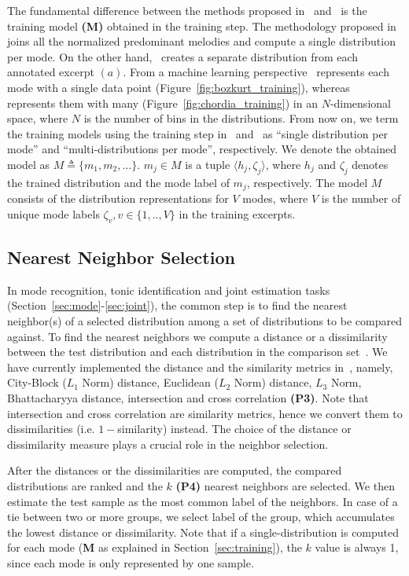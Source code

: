 \documentclass{sig-alternate}
\begin{document}
The fundamental difference between the methods proposed in~\cite{chordia} and~\cite{bozkurt_makam} is the training model {\bf (M)} obtained in the training step. The methodology proposed in~\cite{bozkurt_tonic, bozkurt_makam} joins all the normalized predominant melodies and compute a single distribution per mode. On the other hand,~\cite{chordia} creates a separate distribution from each annotated excerpt $(a)$. From a machine learning perspective~\cite{bozkurt_makam} represents each mode with a single data point (Figure~\ref{fig:bozkurt_training}), whereas~\cite{chordia} represents them with many (Figure~\ref{fig:chordia_training}) in an $N$-dimensional space, where $N$ is the number of bins in the distributions. From now on, we term the training models using the training step in~\cite{bozkurt_tonic, bozkurt_makam} and~\cite{chordia} as ``single distribution per mode'' and ``multi-distributions per mode'', respectively. We denote the obtained model as $M \triangleq \{m_1, m_2, \dots\}$. $m_j \in M$ is a tuple $\langle h_j, \zeta_j\rangle$, where $h_j$ and $\zeta_j$ denotes the trained distribution and the mode label of $m_j$, respectively. The model $M$ consists of the distribution representations for $V$ modes, where $V$ is the number of unique mode labels $\zeta_v, v \in \{1,..,V\}$ in the training excerpts.

\subsection{Nearest Neighbor Selection}\label{sec:distance}
In mode recognition, tonic identification and joint estimation tasks (Section~\ref{sec:mode}-\ref{sec:joint}), the common step is to find the nearest neighbor(s) of a selected distribution among a set of distributions to be compared against. To find the nearest neighbors we compute a distance or a dissimilarity between the test distribution and each distribution in the comparison set~\cite{distance}. We have currently implemented the distance and the similarity metrics in~\cite{bozkurt_makam, chordia}, namely, City-Block ($L_1$ Norm) distance, Euclidean ($L_2$ Norm) distance, $L_3$ Norm, Bhattacharyya distance, intersection and cross correlation {\bf (P3)}. Note that intersection and cross correlation are similarity metrics, hence we convert them to dissimilarities (i.e. $1 - $similarity) instead. The choice of the distance or dissimilarity measure plays a crucial role in the neighbor selection.

After the distances or the dissimilarities are computed, the compared distributions are ranked and the $k$ {\bf (P4)} nearest neighbors are selected. We then estimate the test sample as the most common label of the neighbors. In case of a tie between two or more groups, we select label of the group, which accumulates the lowest distance or dissimilarity. Note that if a single-distribution is computed for each mode ({\bf M} as explained in Section~\ref{sec:training}), the $k$ value is always 1, since each mode is only represented by one sample.
\end{document}
